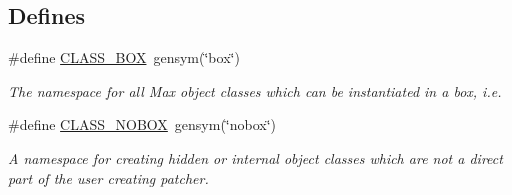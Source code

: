 \subsection*{Defines}
\begin{DoxyCompactItemize}
\item 
\#define \hyperlink{group__class_gaf640c99a1fceb8158c2d1e77381b0320}{CLASS\_\-BOX}~gensym(\char`\"{}box\char`\"{})
\begin{DoxyCompactList}\small\item\em The namespace for all Max object classes which can be instantiated in a box, i.e. \item\end{DoxyCompactList}\item 
\hypertarget{group__class_ga090d3cbc4f137661806fc1b72249a791}{
\#define \hyperlink{group__class_ga090d3cbc4f137661806fc1b72249a791}{CLASS\_\-NOBOX}~gensym(\char`\"{}nobox\char`\"{})}
\label{group__class_ga090d3cbc4f137661806fc1b72249a791}

\begin{DoxyCompactList}\small\item\em A namespace for creating hidden or internal object classes which are not a direct part of the user creating patcher. \item\end{DoxyCompactList}\end{DoxyCompactItemize}
